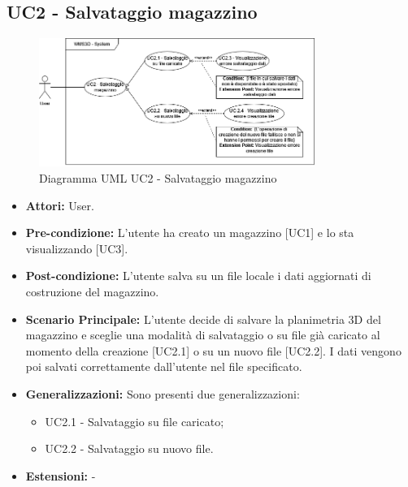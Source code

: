 \subsection{UC2 - Salvataggio magazzino}
\begin{figure}[H]
  \centering
  \includegraphics[width=0.8\textwidth]{UC_diagrams_1-10/UC2_sys.drawio.png}
   \caption{Diagramma UML UC2 - Salvataggio magazzino}
\end{figure}
\begin{itemize}
    \item \textbf{Attori:} User.
    \item \textbf{Pre-condizione:}  L'utente ha creato un magazzino [UC1] e lo sta visualizzando [UC3].
    \item \textbf{Post-condizione:} L'utente salva su un file locale i dati aggiornati di costruzione del magazzino.
    \item \textbf{Scenario Principale:} L'utente decide di salvare la planimetria 3D del magazzino e sceglie una modalità di salvataggio o su file già caricato al momento della creazione [UC2.1] o su un nuovo file [UC2.2]. I dati vengono poi salvati correttamente dall'utente nel file specificato.
    \item \textbf{Generalizzazioni:} Sono presenti due generalizzazioni:
    \begin{itemize}
        \item UC2.1 - Salvataggio su file caricato;
        \item UC2.2 - Salvataggio su nuovo file.
    \end{itemize}
    \item \textbf{Estensioni:} -
\end{itemize}


